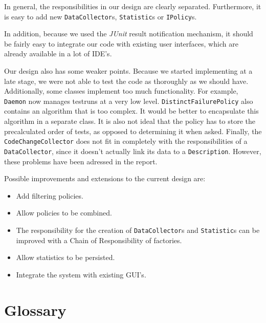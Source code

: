 \documentclass[i2]{oss}
\newcommand{\class}[1]{\texttt{#1}}
\newcommand{\junit}{\emph{JUnit }}
\begin{document}
In general, the responsibilities in our design are clearly separated.
Furthermore, it is easy to add new \class{DataCollector}s, \class{Statistic}s or \class{IPolicy}s.

In addition, because we used the \junit result notification mechanism, it should be fairly easy to 
integrate our code with existing user interfaces, which are already available in a lot of IDE's.

Our design also has some weaker points. 
Because we started implementing at a late stage, we were not able to test the code as thoroughly as we should have.
Additionally, some classes implement too much functionality.
For example, \class{Daemon} now manages testruns at a very low level.
\class{DistinctFailurePolicy} also contains an algorithm that is too complex.
It would be better to encapsulate this algorithm in a separate class.
It is also not ideal that the policy has to store the precalculated order of tests, as opposed to determining it when asked.
Finally, the \class{CodeChangeCollector} does not fit in completely with the responsibilities of a \class{DataCollector}, since it doesn't actually link its data to a \class{Description}.
However, these problems have been adressed in the report.

Possible improvements and extensions to the current design are:
\begin{itemize}
\item Add filtering policies.
\item Allow policies to be combined.
\item The responsibility for the creation of \class{DataCollector}s and \class{Statistic}s can be improved with a Chain of Responsibility of factories.
\item Allow statistics to be persisted.
\item Integrate the system with existing GUI's.
\end{itemize}


\section{Glossary}
\label{ssec:glossary}
\end{document}

